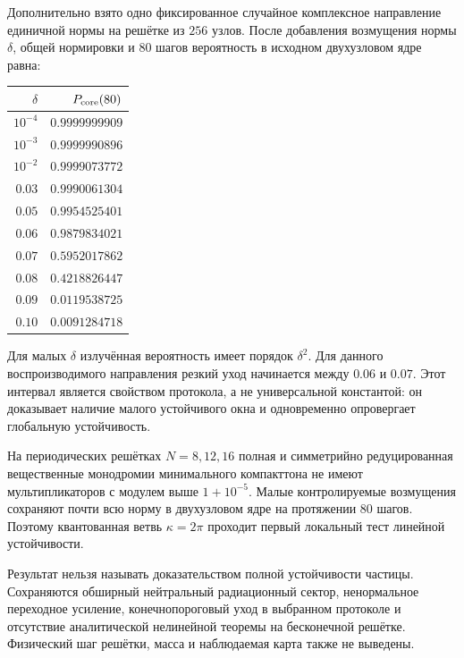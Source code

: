 Дополнительно взято одно фиксированное случайное комплексное направление
единичной нормы на решётке из $256$ узлов. После добавления возмущения
нормы $\delta$, общей нормировки и $80$ шагов вероятность в исходном
двухузловом ядре равна:
\begin{center}
\begin{tabular}{@{}rr@{}}
\toprule
$\delta$ & $P_{\rm core}(80)$ \\
\midrule
$10^{-4}$ & $0.9999999909$ \\
$10^{-3}$ & $0.9999990896$ \\
$10^{-2}$ & $0.9999073772$ \\
$0.03$ & $0.9990061304$ \\
$0.05$ & $0.9954525401$ \\
$0.06$ & $0.9879834021$ \\
$0.07$ & $0.5952017862$ \\
$0.08$ & $0.4218826447$ \\
$0.09$ & $0.0119538725$ \\
$0.10$ & $0.0091284718$ \\
\bottomrule
\end{tabular}
\end{center}
Для малых $\delta$ излучённая вероятность имеет порядок $\delta^2$.
Для данного воспроизводимого направления резкий уход начинается между
$0.06$ и $0.07$. Этот интервал является свойством протокола, а не
универсальной константой: он доказывает наличие малого устойчивого окна и
одновременно опровергает глобальную устойчивость.

\begin{theorem}
На периодических решётках $N=8,12,16$ полная и симметрийно редуцированная
вещественные монодромии минимального компакттона не имеют
мультипликаторов с модулем выше $1+10^{-5}$. Малые контролируемые
возмущения сохраняют почти всю норму в двухузловом ядре на протяжении
$80$ шагов. Поэтому квантованная ветвь $\kappa=2\pi$ проходит первый
локальный тест линейной устойчивости.
\end{theorem}

\begin{nogocriterion}
Результат нельзя называть доказательством полной устойчивости частицы.
Сохраняются обширный нейтральный радиационный сектор, ненормальное
переходное усиление, конечнопороговый уход в выбранном протоколе и
отсутствие аналитической нелинейной теоремы на бесконечной решётке.
Физический шаг решётки, масса и наблюдаемая карта также не выведены.
\end{nogocriterion}

